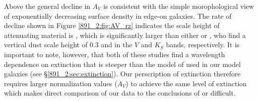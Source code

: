 


Above  the general decline in $A_V$ is consistent with
the simple morophological view of exponentially decreasing surface
density in edge-on galaxies. The rate of decline shown in Figure
\ref{891_2:fig:AV_rz} indicates the scale height of attenuating material is
, which is significantly larger than either
\citet{Xilouris99} or \citet{Schechtman-Rook12}, who find a vertical
dust scale height of 0.3 and  in the $V$ and $K_S$
bands, respectively. It is important to note, however, that both of
these studies find a wavelength dependence on extinction that is
steeper than the model of \citet{Charlot00} used in our model galaxies
(see \S\ref{891_2:sec:extinction}). Our perscription of extinction therefore
requires larger normalization values ($A_V$) to achieve the same level
of extinction which makes direct comparison of our data to the
conclusions of \citet{Xilouris99} or \citet{Schechtman-Rook12}
difficult.


